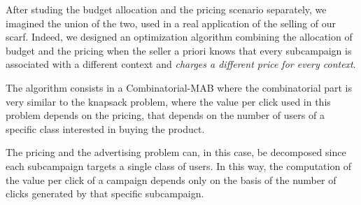 After studing the budget allocation and the pricing scenario separately, we imagined the union of the two, used in a real application of the selling of our scarf.
Indeed, we designed an optimization algorithm combining the allocation of budget and the pricing when the seller a priori knows that every subcampaign is associated with a different context and \emph{charges a different price for every context}.

The algorithm consists in a Combinatorial-MAB where the combinatorial part is very similar to the knapsack problem, where the value per click used in this problem depends on the pricing, that depends on the number of users of a specific class interested in buying the product.

The pricing and the advertising problem can, in this case, be decomposed since each subcampaign targets a single class of users. In this way, the computation of the value per click of a campaign depends only on the basis of the number of clicks generated by that specific subcampaign. 